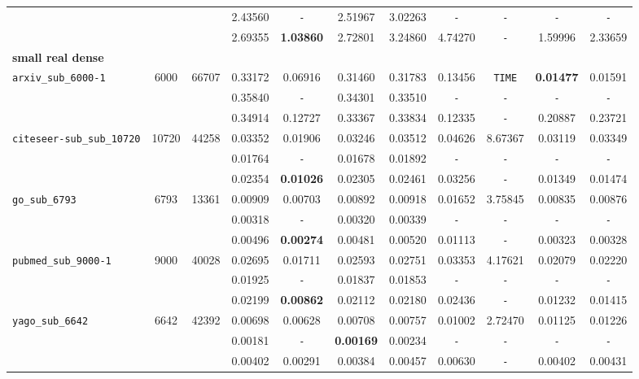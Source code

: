 {\begin{tabular}{ l c c | c c c c c c c c }
 &  &  & 2.43560 & \verb|-| & 2.51967 & 3.02263 & \verb|-| & \verb|-| & \verb|-| & \verb|-| \\
 &  &  & 2.69355 & \textbf{1.03860} & 2.72801 & 3.24860 & 4.74270 & \verb|-| & 1.59996 & 2.33659 \\
\hline
\multicolumn{11}{l}{\textbf{small real dense}} \\
\hline
\verb|arxiv_sub_6000-1| & 6000 & 66707 & 0.33172 & 0.06916 & 0.31460 & 0.31783 & 0.13456 & \verb|TIME| & \textbf{0.01477} & 0.01591 \\
 &  &  & 0.35840 & \verb|-| & 0.34301 & 0.33510 & \verb|-| & \verb|-| & \verb|-| & \verb|-| \\
 &  &  & 0.34914 & 0.12727 & 0.33367 & 0.33834 & 0.12335 & \verb|-| & 0.20887 & 0.23721 \\
\hline
\verb|citeseer-sub_sub_10720| & 10720 & 44258 & 0.03352 & 0.01906 & 0.03246 & 0.03512 & 0.04626 & 8.67367 & 0.03119 & 0.03349 \\
 &  &  & 0.01764 & \verb|-| & 0.01678 & 0.01892 & \verb|-| & \verb|-| & \verb|-| & \verb|-| \\
 &  &  & 0.02354 & \textbf{0.01026} & 0.02305 & 0.02461 & 0.03256 & \verb|-| & 0.01349 & 0.01474 \\
\hline
\verb|go_sub_6793| & 6793 & 13361 & 0.00909 & 0.00703 & 0.00892 & 0.00918 & 0.01652 & 3.75845 & 0.00835 & 0.00876 \\
 &  &  & 0.00318 & \verb|-| & 0.00320 & 0.00339 & \verb|-| & \verb|-| & \verb|-| & \verb|-| \\
 &  &  & 0.00496 & \textbf{0.00274} & 0.00481 & 0.00520 & 0.01113 & \verb|-| & 0.00323 & 0.00328 \\
\hline
\verb|pubmed_sub_9000-1| & 9000 & 40028 & 0.02695 & 0.01711 & 0.02593 & 0.02751 & 0.03353 & 4.17621 & 0.02079 & 0.02220 \\
 &  &  & 0.01925 & \verb|-| & 0.01837 & 0.01853 & \verb|-| & \verb|-| & \verb|-| & \verb|-| \\
 &  &  & 0.02199 & \textbf{0.00862} & 0.02112 & 0.02180 & 0.02436 & \verb|-| & 0.01232 & 0.01415 \\
\hline
\verb|yago_sub_6642| & 6642 & 42392 & 0.00698 & 0.00628 & 0.00708 & 0.00757 & 0.01002 & 2.72470 & 0.01125 & 0.01226 \\
 &  &  & 0.00181 & \verb|-| & \textbf{0.00169} & 0.00234 & \verb|-| & \verb|-| & \verb|-| & \verb|-| \\
 &  &  & 0.00402 & 0.00291 & 0.00384 & 0.00457 & 0.00630 & \verb|-| & 0.00402 & 0.00431 \\
\hline
  \end{tabular}
}

